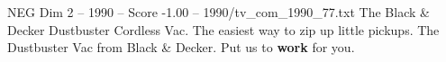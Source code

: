 \begin{textsample}{NEG Dim 2 – 1990 – Score -1.00 – 1990/tv\_com\_1990\_77.txt}  \label{ex:f2_neg_067}
The Black \& Decker Dustbuster Cordless Vac.
The easiest way to zip up little pickups.
The Dustbuster Vac from Black \& Decker.
Put us to \textbf{work} for you.

\end{textsample}
